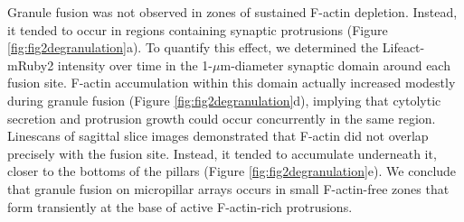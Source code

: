 Granule fusion was not observed in zones of sustained F-actin depletion. Instead, it tended to occur in regions containing synaptic protrusions (Figure \ref{fig:fig2degranulation}a). To quantify this effect, we determined the Lifeact-mRuby2 intensity over time in the 1-$\mu$m-diameter synaptic domain around each fusion site. F-actin accumulation within this domain actually increased modestly during granule fusion (Figure \ref{fig:fig2degranulation}d), implying that cytolytic secretion and protrusion growth could occur concurrently in the same region. Linescans of sagittal slice images demonstrated that F-actin did not overlap precisely with the fusion site. Instead, it tended to accumulate underneath it, closer to the bottoms of the pillars (Figure \ref{fig:fig2degranulation}e). We conclude that granule fusion on micropillar arrays occurs in small F-actin-free zones that form transiently at the base of active F-actin-rich protrusions.




